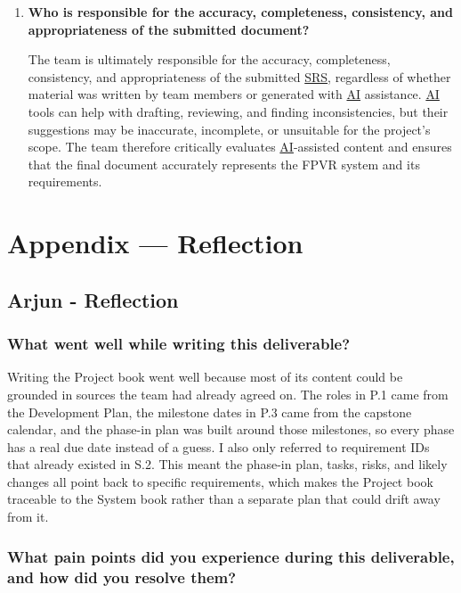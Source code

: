 \documentclass[12pt]{article}
\begin{document}
\begin{enumerate}
    \item \textbf{Who is responsible for the accuracy, completeness,
    consistency, and appropriateness of the submitted document?}

    The team is ultimately responsible for the accuracy, completeness,
    consistency, and appropriateness of the submitted \hyperlink{glos:SRS}{SRS}, regardless of
    whether material was written by team members or generated with \hyperlink{glos:AI}{AI}
    assistance. \hyperlink{glos:AI}{AI} tools can help with drafting, reviewing, and finding
    inconsistencies, but their suggestions may be inaccurate, incomplete, or
    unsuitable for the project's scope. The team therefore critically
    evaluates \hyperlink{glos:AI}{AI}-assisted content and ensures that the final document
    accurately represents the FPVR system and its requirements.
\end{enumerate}

\newpage{}

\section*{Appendix --- Reflection}

\subsection*{Arjun - Reflection}

\subsubsection*{What went well while writing this deliverable?}

Writing the Project book went well because most of its content could be
grounded in sources the team had already agreed on. The roles in P.1 came from
the Development Plan, the milestone dates in P.3 came from the capstone
calendar, and the phase-in plan was built around those milestones, so every
phase has a real due date instead of a guess. I also only referred to
requirement IDs that already existed in S.2. This meant the phase-in plan,
tasks, risks, and likely changes all point back to specific requirements,
which makes the Project book traceable to the System book rather than a
separate plan that could drift away from it.

\subsubsection*{What pain points did you experience during this deliverable,
and how did you resolve them?}
\end{document}
